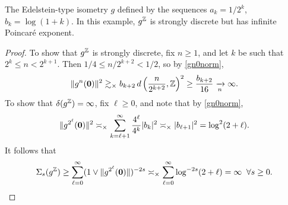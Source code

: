 \begin{edelsteinexample}
\label{exampleparabolicinfinite}
The Edelstein-type isometry $g$ defined by the sequences $a_k = 1/2^k$, $b_k = \log(1 + k)$. In this example, $g^\Z$ is strongly discrete but has infinite Poincar\'e exponent.
\end{edelsteinexample}
\begin{proof}
To show that $g^\Z$ is strongly discrete, fix $n\geq 1$, and let $k$ be such that $2^k\leq n < 2^{k + 1}$. Then $1/4 \leq n/2^{k + 2} < 1/2$, so by \eqref{gn0norm},
\[
\|g^n(\0)\|^2 \gtrsim_\times b_{k + 2} \,\dist\left(\frac{n}{2^{k + 2}},\Z\right)^2 \geq \frac{b_{k + 2}}{16} \tendsto n \infty.
\]
To show that $\delta(g^\Z) = \infty$, fix $\ell\geq 0$, and note that by \eqref{gn0norm},
\[
\|g^{2^\ell}(\mathbf 0)\|^2 \asymp_\times \sum_{k = \ell + 1}^\infty \frac{4^\ell}{4^k} |b_k|^2 \asymp_\times |b_{\ell + 1}|^2 = \log^2(2 + \ell).
\]
It follows that
\[
\Sigma_s(g^\Z) \geq \sum_{\ell = 0}^\infty (1\vee \|g^{2^\ell}(\0)\|)^{-2s} \asymp_\times \sum_{\ell = 0}^\infty \log^{-2s}(2 + \ell) = \infty \all s \geq 0.
\]
\end{proof}

%
%

%
%

